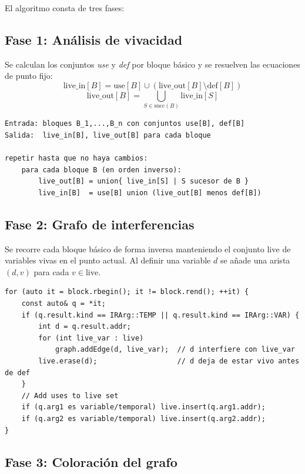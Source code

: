 El algoritmo consta de tres fases:

\subsection{Fase 1: Análisis de vivacidad}

Se calculan los conjuntos \emph{use} y \emph{def} por bloque básico y
se resuelven las ecuaciones de punto fijo:
\[
  \text{live\_in}[B]  = \text{use}[B]  \cup (\text{live\_out}[B] \setminus \text{def}[B])
\]
\[
  \text{live\_out}[B] = \bigcup_{S \in \text{succ}(B)} \text{live\_in}[S]
\]

\begin{lstlisting}[style=pseudo, caption={Análisis de vivacidad (punto fijo)}]
Entrada: bloques B_1,...,B_n con conjuntos use[B], def[B]
Salida:  live_in[B], live_out[B] para cada bloque

repetir hasta que no haya cambios:
    para cada bloque B (en orden inverso):
        live_out[B] = union{ live_in[S] | S sucesor de B }
        live_in[B]  = use[B] union (live_out[B] menos def[B])
\end{lstlisting}

\subsection{Fase 2: Grafo de interferencias}

Se recorre cada bloque básico de forma inversa manteniendo el conjunto
$\text{live}$ de variables vivas en el punto actual. Al definir una
variable $d$ se añade una arista $(d, v)$ para cada $v \in \text{live}$.

\begin{lstlisting}[style=cpp, caption={Construcción del grafo de interferencias}]
for (auto it = block.rbegin(); it != block.rend(); ++it) {
    const auto& q = *it;
    if (q.result.kind == IRArg::TEMP || q.result.kind == IRArg::VAR) {
        int d = q.result.addr;
        for (int live_var : live)
            graph.addEdge(d, live_var);  // d interfiere con live_var
        live.erase(d);                   // d deja de estar vivo antes de def
    }
    // Add uses to live set
    if (q.arg1 es variable/temporal) live.insert(q.arg1.addr);
    if (q.arg2 es variable/temporal) live.insert(q.arg2.addr);
}
\end{lstlisting}

\subsection{Fase 3: Coloración del grafo}

